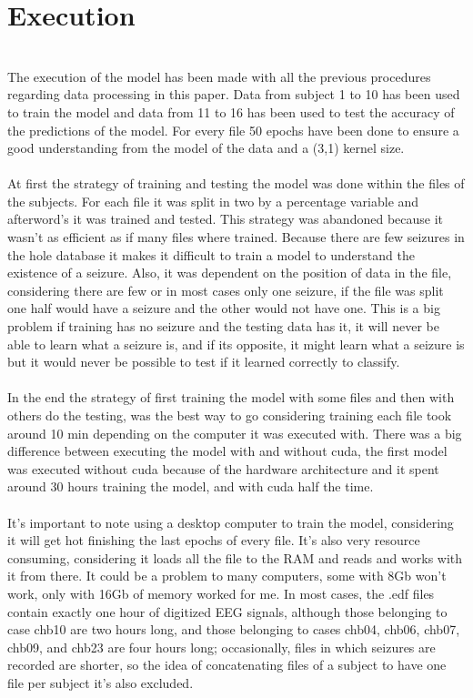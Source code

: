 \section{Execution}
\leavevmode\\
The execution of the model has been made with all the previous procedures regarding data processing in this paper. Data from subject 1 to 10 has been used to train the model and data from 11 to 16 has been used to test the accuracy of the predictions of the model. For every file 50 epochs have been done to ensure a good understanding from the model of the data and a (3,1) kernel size.
\\\\
At first the strategy of training and testing the model was done within the files of the subjects. For each file it was split in two by a percentage variable and afterword’s it was trained and tested. This strategy was abandoned because it wasn’t as efficient as if many files where trained. Because there are few seizures in the hole database it makes it difficult to train a model to understand the existence of a seizure. Also, it was dependent on the position of data in the file, considering there are few or in most cases only one seizure, if the file was split one half would have a seizure and the other would not have one. This is a big problem if training has no seizure and the testing data has it, it will never be able to learn what a seizure is, and if its opposite, it might learn what a seizure is but it would never be possible to test if it learned correctly to classify.
\\\\
In the end the strategy of first training the model with some files and then with others do the testing, was the best way to go considering training each file took around 10 min depending on the computer it was executed with. There was a big difference between executing the model with and without cuda, the first model was executed without cuda because of the hardware architecture and it spent around 30 hours training the model, and with cuda half the time.
\\\\
It’s important to note using a desktop computer to train the model, considering it will get hot finishing the last epochs of every file. It’s also very resource consuming, considering it loads all the file to the RAM and reads and works with it from there. It could be a problem to many computers, some with 8Gb won’t work, only with 16Gb of memory worked for me. In most cases, the .edf files contain exactly one hour of digitized EEG signals, although those belonging to case chb10 are two hours long, and those belonging to cases chb04, chb06, chb07, chb09, and chb23 are four hours long; occasionally, files in which seizures are recorded are shorter, so the idea of concatenating files of a subject to have one file per subject it’s also excluded. 
\\


